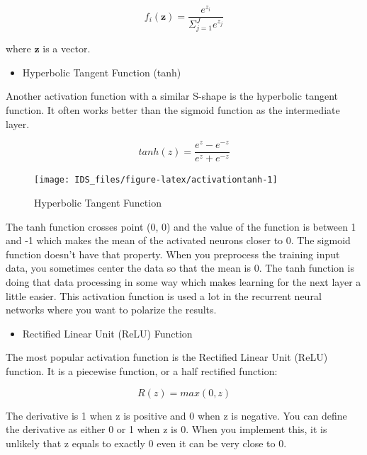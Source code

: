 \documentclass[
  12pt,
]{krantz}
\providecommand{\tightlist}{%
  \setlength{\itemsep}{0pt}\setlength{\parskip}{0pt}}
\begin{document}
\begin{equation}
f_i(\mathbf{z}) = \frac{e^{z_i}}{\Sigma_{j=1}^{J} e^{z_j} }
\label{eq:softmax}
\end{equation}

where \(\mathbf{z}\) is a vector.

\begin{itemize}
\tightlist
\item
  Hyperbolic Tangent Function (tanh)
\end{itemize}

Another activation function with a similar S-shape is the hyperbolic tangent function. It often works better than the sigmoid function as the intermediate layer.

\begin{equation}
tanh(z) = \frac{e^{z} - e^{-z}}{e^{z} + e^{-z}}
\label{eq:tanh}
\end{equation}

\begin{figure}

{\centering \texttt{[image: IDS\_files/figure-latex/activationtanh-1]} 

}

\caption{Hyperbolic Tangent Function}\label{fig:activationtanh}
\end{figure}

The tanh function crosses point (0, 0) and the value of the function is between 1 and -1 which makes the mean of the activated neurons closer to 0. The sigmoid function doesn't have that property. When you preprocess the training input data, you sometimes center the data so that the mean is 0. The tanh function is doing that data processing in some way which makes learning for the next layer a little easier. This activation function is used a lot in the recurrent neural networks where you want to polarize the results.

\begin{itemize}
\tightlist
\item
  Rectified Linear Unit (ReLU) Function
\end{itemize}

The most popular activation function is the Rectified Linear Unit (ReLU) function. It is a piecewise function, or a half rectified function:

\begin{equation}
R(z) = max(0, z)
\label{eq:relu}
\end{equation}

The derivative is 1 when z is positive and 0 when z is negative. You can define the derivative as either 0 or 1 when z is 0. When you implement this, it is unlikely that z equals to exactly 0 even it can be very close to 0.
\end{document}
